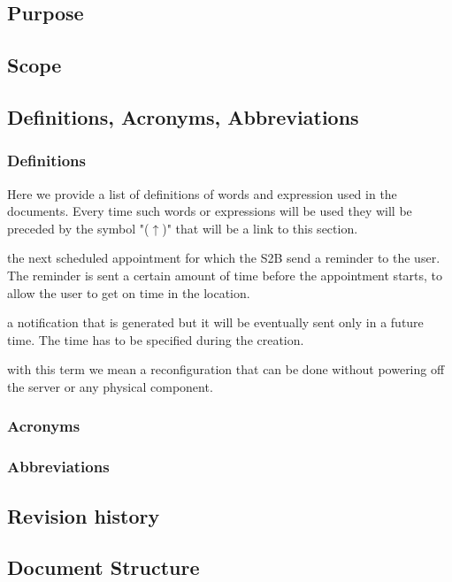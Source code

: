 \subsection{Purpose}
	
\subsection{Scope}
	
\subsection{Definitions, Acronyms, Abbreviations}
	\subsubsection{Definitions}
	\label{definitions}
	Here we provide a list of definitions of words and expression used in the documents. Every time such words or expressions will be used they will be preceded by the symbol "($\uparrow$)" that will be a link to this section.
	\begin{description}[before={\renewcommand{\makelabel}[1]{-- \textbf{\textit{##1}}:}}]
		\item[Incoming Appointment] the next scheduled appointment for which the S2B send a reminder to the user. The reminder is sent  a certain amount of time before the appointment starts, to allow the user to get on time in the location.
		\item[Future Notification] a notification that is generated but it will be eventually sent only in a future time. The time has to be specified during the creation.
		\item[Dynamic Configuration] with this term we mean a reconfiguration that can be done without powering off the server or any physical component.
	\end{description}
	\subsubsection{Acronyms}
	\subsubsection{Abbreviations}
	
\subsection{Revision history}
	
\subsection{Document Structure}
